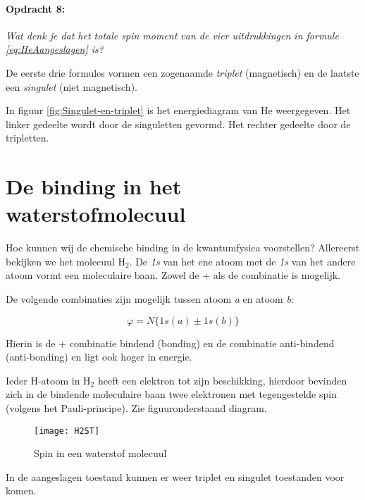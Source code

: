 \paragraph*{Opdracht 8: }

\emph{Wat denk je dat het totale spin moment van de vier uitdrukkingen
in formule \ref{eq:HeAangeslagen} is?}

De eerste drie formules vormen een zogenaamde \emph{triplet} (magnetisch)
en de laatste een \emph{singulet} (niet magnetisch).

In figuur \ref{fig:Singulet-en-triplet} is het energiediagram van
He weergegeven. Het linker gedeelte wordt door de singuletten gevormd.
Het rechter gedeelte door de tripletten.


\section{De binding in het waterstofmolecuul}

Hoe kunnen wij de chemische binding in de kwantumfysica voorstellen?
Allereerst bekijken we het molecuul $\mathrm{H}_{2}$. De \emph{1s}
van het ene atoom met de \emph{1s} van het andere atoom vormt een
moleculaire baan. Zowel de + als de \textendash{} combinatie is mogelijk.

De volgende combinaties zijn mogelijk tussen atoom \emph{a} en atoom
\emph{b}:

\begin{equation}
\varphi=N\{1s(a)\pm1s(b)\}
\end{equation}


Hierin is de + combinatie bindend (bonding) en de \textendash{} combinatie
anti-bindend (anti-bonding) en ligt ook hoger in energie.

Ieder H-atoom in $\mathrm{H}_{2}$ heeft een elektron tot zijn beschikking,
hierdoor bevinden zich in de bindende moleculaire baan twee elektronen
met tegengestelde spin (volgens het Pauli-principe). Zie figuuronderstaand
diagram.

\begin{figure}[h]
\noindent \begin{centering}
\texttt{[image: H2ST]}
\par\end{centering}

\caption{Spin in een waterstof molecuul}
\end{figure}


In de aangeslagen toestand kunnen er weer triplet en singulet toestanden
voor komen.


